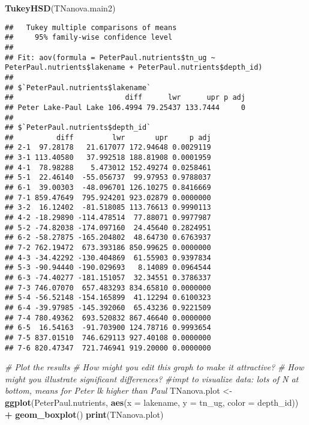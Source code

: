 \documentclass[]{article}
\newenvironment{Shaded}{\begin{snugshade}}{\end{snugshade}}
\newcommand{\KeywordTok}[1]{\textcolor[rgb]{0.13,0.29,0.53}{\textbf{#1}}}
\newcommand{\DataTypeTok}[1]{\textcolor[rgb]{0.13,0.29,0.53}{#1}}
\newcommand{\StringTok}[1]{\textcolor[rgb]{0.31,0.60,0.02}{#1}}
\newcommand{\CommentTok}[1]{\textcolor[rgb]{0.56,0.35,0.01}{\textit{#1}}}
\newcommand{\OperatorTok}[1]{\textcolor[rgb]{0.81,0.36,0.00}{\textbf{#1}}}
\newcommand{\NormalTok}[1]{#1}
\begin{document}
\begin{Shaded}
\begin{Highlighting}[]
\KeywordTok{TukeyHSD}\NormalTok{(TNanova.main2)}
\end{Highlighting}
\end{Shaded}

\begin{verbatim}
##   Tukey multiple comparisons of means
##     95% family-wise confidence level
## 
## Fit: aov(formula = PeterPaul.nutrients$tn_ug ~ PeterPaul.nutrients$lakename + PeterPaul.nutrients$depth_id)
## 
## $`PeterPaul.nutrients$lakename`
##                          diff      lwr      upr p adj
## Peter Lake-Paul Lake 106.4994 79.25437 133.7444     0
## 
## $`PeterPaul.nutrients$depth_id`
##          diff         lwr       upr     p adj
## 2-1  97.28178   21.617077 172.94648 0.0029119
## 3-1 113.40580   37.992518 188.81908 0.0001959
## 4-1  78.98288    5.473012 152.49274 0.0258461
## 5-1  22.46140  -55.056737  99.97953 0.9788037
## 6-1  39.00303  -48.096701 126.10275 0.8416669
## 7-1 859.47649  795.924201 923.02879 0.0000000
## 3-2  16.12402  -81.518085 113.76613 0.9990113
## 4-2 -18.29890 -114.478514  77.88071 0.9977987
## 5-2 -74.82038 -174.097160  24.45640 0.2824951
## 6-2 -58.27875 -165.204802  48.64730 0.6763937
## 7-2 762.19472  673.393186 850.99625 0.0000000
## 4-3 -34.42292 -130.404869  61.55903 0.9397834
## 5-3 -90.94440 -190.029693   8.14089 0.0964544
## 6-3 -74.40277 -181.151057  32.34551 0.3786337
## 7-3 746.07070  657.483293 834.65810 0.0000000
## 5-4 -56.52148 -154.165899  41.12294 0.6100323
## 6-4 -39.97985 -145.392060  65.43236 0.9221509
## 7-4 780.49362  693.520832 867.46640 0.0000000
## 6-5  16.54163  -91.703900 124.78716 0.9993654
## 7-5 837.01510  746.629113 927.40108 0.0000000
## 7-6 820.47347  721.746941 919.20000 0.0000000
\end{verbatim}

\begin{Shaded}
\begin{Highlighting}[]
\CommentTok{# Plot the results}
\CommentTok{# How might you edit this graph to make it attractive?}
\CommentTok{# How might you illustrate significant differences?}
  \CommentTok{#impt to visualize data: lots of N at bottom, means for Peter lk higher than Paul}
\NormalTok{TNanova.plot <-}\StringTok{ }\KeywordTok{ggplot}\NormalTok{(PeterPaul.nutrients, }\KeywordTok{aes}\NormalTok{(}\DataTypeTok{x =}\NormalTok{ lakename, }\DataTypeTok{y =}\NormalTok{ tn_ug, }\DataTypeTok{color =}\NormalTok{ depth_id)) }\OperatorTok{+}
\StringTok{  }\KeywordTok{geom_boxplot}\NormalTok{()}
\KeywordTok{print}\NormalTok{(TNanova.plot)}
\end{Highlighting}
\end{Shaded}
\end{document}
